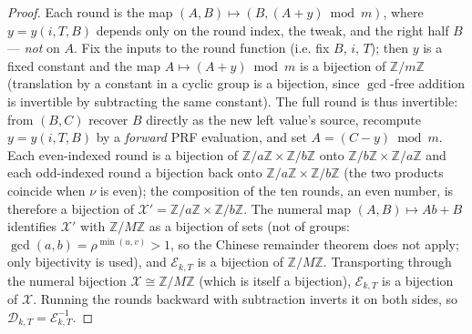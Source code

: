 \documentclass[11pt,a4paper]{article}
\theoremstyle{definition}
\theoremstyle{remark}
\newcommand{\Z}{\ensuremath{\mathbb{Z}}}
\begin{document}
\begin{proof}
Each round is the map \((A, B) \mapsto (B, (A + y) \bmod m)\), where \(y = y(i, T, B)\) depends only on the round index, the tweak, and the right half \(B\) --- \emph{not} on \(A\). Fix the inputs to the round function (i.e. fix \(B\), \(i\), \(T\)); then \(y\) is a fixed constant and the map \(A \mapsto (A + y) \bmod m\) is a bijection of \(\Z/m\Z\) (translation by a constant in a cyclic group is a bijection, since \(\gcd\)-free addition is invertible by subtracting the same constant). The full round is thus invertible: from \((B, C)\) recover \(B\) directly as the new left value's source, recompute \(y = y(i,T,B)\) by a \emph{forward} PRF evaluation, and set \(A = (C - y) \bmod m\). Each even-indexed round is a bijection of \(\Z/a\Z \times \Z/b\Z\) onto \(\Z/b\Z \times \Z/a\Z\) and each odd-indexed round a bijection back onto \(\Z/a\Z \times \Z/b\Z\) (the two products coincide when \(\nu\) is even); the composition of the ten rounds, an even number, is therefore a bijection of \(\mathcal{X}' = \Z/a\Z \times \Z/b\Z\). The numeral map \((A,B) \mapsto Ab + B\) identifies \(\mathcal{X}'\) with \(\Z/M\Z\) as a bijection of sets (not of groups: \(\gcd(a,b) = \rho^{\min(u,v)} > 1\), so the Chinese remainder theorem does not apply; only bijectivity is used), and \(\mathcal{E}_{k,T}\) is a bijection of \(\Z/M\Z\). Transporting through the numeral bijection \(\mathcal{X} \cong \Z/M\Z\) (which is itself a bijection), \(\mathcal{E}_{k,T}\) is a bijection of \(\mathcal{X}\). Running the rounds backward with subtraction inverts it on both sides, so \(\mathcal{D}_{k,T} = \mathcal{E}_{k,T}^{-1}\).
\end{proof}
\end{document}
